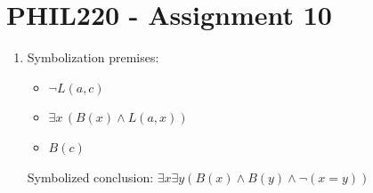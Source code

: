 \documentclass{article}
\begin{document}
\section*{PHIL220 - Assignment 10}

\begin{enumerate}

    \item
          Symbolization premises:
          \begin{itemize}
              \item $\neg L(a,c)$
              \item $\exists x\,(B(x)\land L(a,x))$
              \item $B(c)$
          \end{itemize}
          Symbolized conclusion: $\exists x\exists y\left(B(x)\wedge B(y)\wedge\neg(x=y)\right)$


\end{enumerate}
\end{document}
